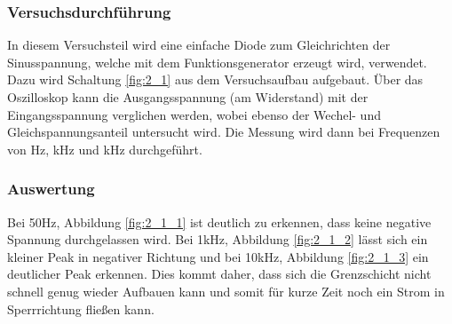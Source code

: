 \documentclass[12pt,a4paper]{article}
\begin{document}
\subsubsection{Versuchsdurchführung}
In diesem Versuchsteil wird eine einfache Diode zum Gleichrichten der Sinusspannung, welche mit dem Funktionsgenerator erzeugt wird, verwendet. Dazu wird Schaltung \ref{fig:2_1} aus dem Versuchsaufbau aufgebaut. Über das Oszilloskop kann die Ausgangsspannung (am Widerstand) mit der Eingangsspannung verglichen werden, wobei ebenso der Wechel- und Gleichspannungsanteil untersucht wird. Die Messung wird dann bei Frequenzen von \unit[50]{Hz}, \unit[1]{kHz} und \unit[10]{kHz} durchgeführt.
\subsubsection{Auswertung}
Bei 50Hz, Abbildung \ref{fig:2_1_1} ist deutlich zu erkennen, dass keine negative Spannung durchgelassen wird. Bei 1kHz, Abbildung \ref{fig:2_1_2} lässt sich ein kleiner Peak in negativer Richtung und bei 10kHz, Abbildung \ref{fig:2_1_3} ein deutlicher Peak erkennen. Dies kommt daher, dass sich die Grenzschicht nicht schnell genug wieder Aufbauen kann und somit für kurze Zeit noch ein Strom in Sperrrichtung fließen kann.
\end{document}

